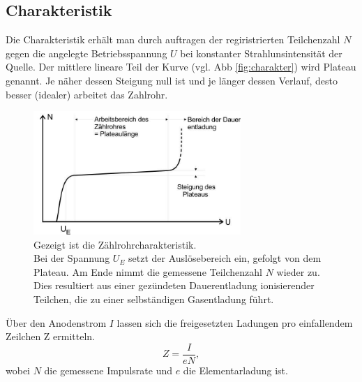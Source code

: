 \subsection{Charakteristik}
Die Charakteristik erhält man durch auftragen der regiristrierten Teilchenzahl $N$
gegen die angelegte Betriebsspannung $U$ bei konstanter Strahlunsintensität der Quelle.
Der mittlere lineare Teil der Kurve (vgl. Abb \ref{fig:charakter}) wird Plateau genannt.
Je näher dessen Steigung null ist und je länger dessen Verlauf, desto besser (idealer) arbeitet 
das Zahlrohr.
\begin{figure}
    \centering
    \includegraphics[width=0.7\textwidth]{input/charakteristik.jpg}
    \caption{Gezeigt ist die Zählrohrcharakteristik.\\
    Bei der Spannung $U_E$ setzt der Auslösebereich ein, gefolgt von dem
    Plateau. Am Ende nimmt die gemessene Teilchenzahl $N$ wieder zu.
    Dies resultiert aus einer gezündeten Dauerentladung ionisierender Teilchen,
    die zu einer selbständigen Gasentladung führt.\cite[224]{anleitung}}
\end{figure}
Über den Anodenstrom $I$ lassen sich die freigesetzten Ladungen pro einfallendem Zeilchen Z
ermitteln.
\begin{equation}
    Z=\frac{I}{eN},
    \label{eqn:strom}
\end{equation}
wobei $N$ die gemessene Impulsrate und $e$ die Elementarladung ist.
